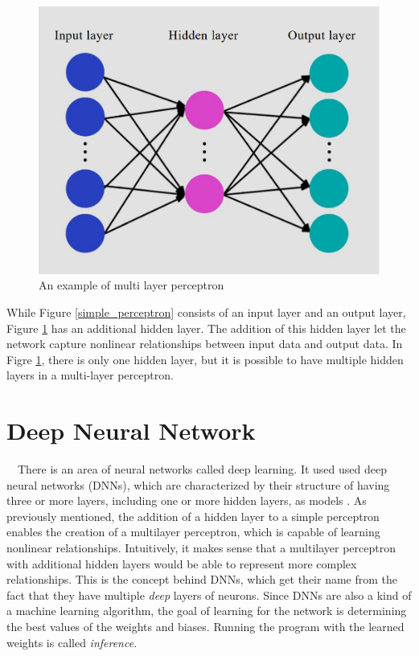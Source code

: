 \begin{figure}[h]
  \centering
  \includegraphics[width=130truemm]{resources/2_background/multi_layer_perceptron.png}
  \caption{
    An example of multi layer perceptron
  }
  \label{multilayer_perceptron}
\end{figure}
While Figure \ref{simple_perceptron} consists of an input layer and an 
output layer, Figure \ref{multilayer_perceptron} has an additional hidden 
layer. The addition of this hidden layer let the network capture nonlinear
relationships between input data and output data.
In Figre \ref{multilayer_perceptron}, there is only one hidden layer,
but it is possible to have multiple hidden layers in a multi-layer perceptron.

\section{Deep Neural Network}
　There is an area of neural networks called deep learning. 
It used used deep neural networks (DNNs), which are characterized by their structure
of having three or more layers, including one or more hidden layers, as models \cite{8114708}.
As previously mentioned, the addition of a hidden layer to a simple perceptron 
enables the creation of a multilayer perceptron, which is capable of learning 
nonlinear relationships. 
Intuitively, it makes sense that a multilayer perceptron with additional 
hidden layers would be able to represent more complex relationships.
This is the concept behind DNNs, which get their name from the fact that they 
have multiple \textit{deep} layers of neurons.
Since DNNs are also a kind of a machine learning algorithm, the goal of learning
for the network is determining the best values of the weights and biases. 
Running the program with the learned weights is called \textit{inference}.

